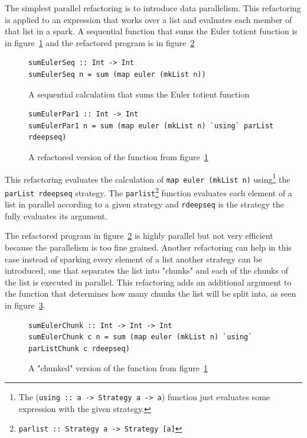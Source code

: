 The simplest parallel refactoring is to introduce data parallelism. This refactoring is applied to an expression that works over a list and evaluates each member of that list in a spark. A sequential function that sums the Euler totient function is in figure~\ref{eulerSeq} and the refactored program is in figure~\ref{eulerPar1}

\begin{figure}[t]
\begin{lstlisting}
sumEulerSeq :: Int -> Int
sumEulerSeq n = sum (map euler (mkList n))
\end{lstlisting}
\caption{A sequential calculation that sums the Euler totient function}
\label{eulerSeq}
\end{figure} 


\begin{figure}[t]
\begin{lstlisting}
sumEulerPar1 :: Int -> Int
sumEulerPar1 n = sum (map euler (mkList n) `using` parList rdeepseq)
\end{lstlisting}
\caption{A refactored version of the function from figure~\ref{eulerSeq}}
\label{eulerPar1}
\end{figure} 
  
This refactoring evaluates the calculation of \texttt{map euler (mkList n)} using\footnote{The (\texttt{using :: a -> Strategy a -> a}) function just evaluates some expression with the given strategy.} the \texttt{parList rdeepseq} strategy. The \texttt{parlist}\footnote{\texttt{parlist :: Strategy a -> Strategy [a]}} function evaluates each element of a list in parallel according to a given strategy and \texttt{rdeepseq} is the strategy the fully evaluates its argument. 
  
The refactored program in figure~\ref{eulerPar1} is highly parallel but not very efficient because the parallelism is too fine grained. Another refactoring can help in this case instead of sparking every element of a list another strategy can be introduced, one that separates the list into "chunks" and each of the chunks of the list is executed in parallel. This refactoring adds an additional argument to the function that determines how many chunks the list will be split into, as seen in figure~\ref{eulerChunk}.
  
\begin{figure}[t]
\begin{lstlisting}
sumEulerChunk :: Int -> Int -> Int
sumEulerChunk c n = sum (map euler (mkList n) `using` parListChunk c rdeepseq)
\end{lstlisting}
\caption{A "chunked" version of the function from figure~\ref{eulerSeq}}
\label{eulerChunk}
\end{figure}  

